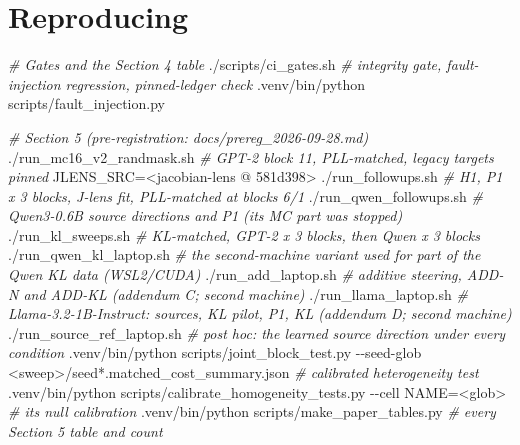 \documentclass[
  10pt,
]{article}
\newenvironment{Shaded}{}{}
\newcommand{\AttributeTok}[1]{\textcolor[rgb]{0.49,0.56,0.16}{#1}}
\newcommand{\CommentTok}[1]{\textcolor[rgb]{0.38,0.63,0.69}{\textit{#1}}}
\newcommand{\ExtensionTok}[1]{#1}
\newcommand{\NormalTok}[1]{#1}
\newcommand{\OperatorTok}[1]{\textcolor[rgb]{0.40,0.40,0.40}{#1}}
\newcommand{\StringTok}[1]{\textcolor[rgb]{0.25,0.44,0.63}{#1}}
\newcommand{\VariableTok}[1]{\textcolor[rgb]{0.10,0.09,0.49}{#1}}
\begin{document}
\section{Reproducing}\label{reproducing}

\begin{Shaded}
\begin{Highlighting}[]
\CommentTok{\# Gates and the Section 4 table}
\ExtensionTok{./scripts/ci\_gates.sh}                     \CommentTok{\# integrity gate, fault{-}injection regression, pinned{-}ledger check}
\ExtensionTok{.venv/bin/python}\NormalTok{ scripts/fault\_injection.py}

\CommentTok{\# Section 5 (pre{-}registration: docs/prereg\_2026{-}09{-}28.md)}
\ExtensionTok{./run\_mc16\_v2\_randmask.sh}                 \CommentTok{\# GPT{-}2 block 11, PLL{-}matched, legacy targets pinned}
\VariableTok{JLENS\_SRC}\OperatorTok{=\textless{}}\NormalTok{jacobian{-}lens }\ExtensionTok{@}\NormalTok{ 581d398}\OperatorTok{\textgreater{}}\NormalTok{ ./run\_followups.sh   }\CommentTok{\# H1, P1 x 3 blocks, J{-}lens fit, PLL{-}matched at blocks 6/1}
\ExtensionTok{./run\_qwen\_followups.sh}                   \CommentTok{\# Qwen3{-}0.6B source directions and P1 (its MC part was stopped)}
\ExtensionTok{./run\_kl\_sweeps.sh}                        \CommentTok{\# KL{-}matched, GPT{-}2 x 3 blocks, then Qwen x 3 blocks}
\ExtensionTok{./run\_qwen\_kl\_laptop.sh}                   \CommentTok{\# the second{-}machine variant used for part of the Qwen KL data (WSL2/CUDA)}
\ExtensionTok{./run\_add\_laptop.sh}                       \CommentTok{\# additive steering, ADD{-}N and ADD{-}KL (addendum C; second machine)}
\ExtensionTok{./run\_llama\_laptop.sh}                     \CommentTok{\# Llama{-}3.2{-}1B{-}Instruct: sources, KL pilot, P1, KL (addendum D; second machine)}
\ExtensionTok{./run\_source\_ref\_laptop.sh}                \CommentTok{\# post hoc: the learned source direction under every condition}
\ExtensionTok{.venv/bin/python}\NormalTok{ scripts/joint\_block\_test.py }\AttributeTok{{-}{-}seed{-}glob} \StringTok{\textquotesingle{}\textless{}sweep\textgreater{}/seed*.matched\_cost\_summary.json\textquotesingle{}}   \CommentTok{\# calibrated heterogeneity test}
\ExtensionTok{.venv/bin/python}\NormalTok{ scripts/calibrate\_homogeneity\_tests.py }\AttributeTok{{-}{-}cell}\NormalTok{ NAME=}\OperatorTok{\textless{}}\NormalTok{glob}\OperatorTok{\textgreater{}}                         \CommentTok{\# its null calibration}
\ExtensionTok{.venv/bin/python}\NormalTok{ scripts/make\_paper\_tables.py                     }\CommentTok{\# every Section 5 table and count}


\end{Highlighting}
\end{Shaded}
\end{document}
